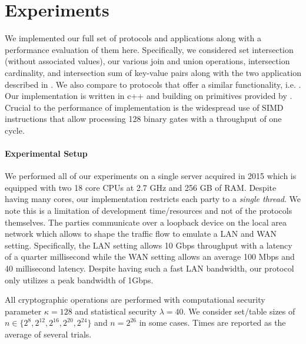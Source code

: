 

\section{Experiments}\label{sec:eval}


We implemented our full set of protocols and applications along with a performance evaluation of them here. Specifically, we considered set intersection (without associated values), our various join and union operations, intersection cardinality, and intersection sum of key-value pairs along with the two application described in . We also compare to protocols that offer a similar functionality, i.e. \cite{CCS:KKRT16, PSWW18,ASIACCS:BlaAgu12,DBLP:conf/cans/CristofaroGT12,cryptoeprint:2017:738}. Our implementation is written in c++ and building on primitives provided by \cite{libOTe}. Crucial to the performance of implementation is the widespread use of SIMD instructions that allow processing 128 binary gates with a throughput of one cycle.



\paragraph{Experimental Setup} We performed all of our experiments on a single server acquired in 2015 which is equipped with two 18 core CPUs at 2.7 GHz and 256 GB of RAM. Despite having many cores, our implementation restricts each party to a \emph{single thread}. We note this is a limitation of development time/resources and not of the protocols themselves. The parties communicate over a loopback device on the local area network which allows to shape the traffic flow to emulate a LAN and WAN setting. Specifically, the LAN setting allows 10 Gbps throughput with a latency of a quarter millisecond while the WAN setting allows an average 100 Mbps and 40 millisecond latency. Despite having such a fast LAN bandwidth, our protocol only utilizes a peak bandwidth of 1Gbps. 

All cryptographic operations are performed with computational security parameter $\kappa=128$ and statistical security $\lambda=40$. We consider set/table sizes of $n\in\{2^8, 2^{12}, 2^{16}, 2^{20}, 2^{24}\}$ and $n=2^{26}$ in some cases. Times are reported as the average of several trials.

